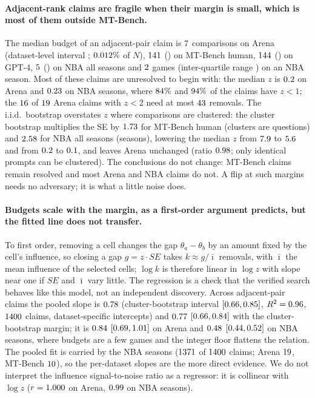 \documentclass{article}
\begin{document}
\paragraph{Adjacent-rank claims are fragile when their margin is small, which is most of them outside MT-Bench.} The median budget of an adjacent-pair claim is $7$ comparisons on Arena (dataset-level interval \biArenaCtwoRange; $0.012\%$ of $N$), $141$ (\biMTHCtwoRange) on MT-Bench human, $144$ (\biMTGCtwoRange) on GPT-4, $5$ (\biNBACtwoRange) on NBA all seasons and $2$ games (inter-quartile range \NBAsCtwoQ) on an NBA season. Most of these claims are unresolved to begin with: the median $z$ is $0.2$ on Arena and $0.23$ on NBA seasons, where $84\%$ and $94\%$ of the claims have $z<1$; the $16$ of $19$ Arena claims with $z<2$ need at most $43$ removals. The i.i.d.\ bootstrap overstates $z$ where comparisons are clustered: the cluster bootstrap multiplies the SE by $1.73$ for MT-Bench human (clusters are questions) and $2.58$ for NBA all seasons (seasons), lowering the median $z$ from $7.9$ to $5.6$ and from $0.2$ to $0.1$, and leaves Arena unchanged (ratio $0.98$; only identical prompts can be clustered). The conclusions do not change: MT-Bench claims remain resolved and most Arena and NBA claims do not. A flip at such margins needs no adversary; it is what a little noise does.

\paragraph{Budgets scale with the margin, as a first-order argument predicts, but the fitted line does not transfer.} To first order, removing a cell changes the gap $\theta_a-\theta_b$ by an amount fixed by the cell's influence, so closing a gap $g=z\cdot SE$ takes $k\approx g/\bar\imath$ removals, with $\bar\imath$ the mean influence of the selected cells; $\log k$ is therefore linear in $\log z$ with slope near one if $SE$ and $\bar\imath$ vary little. The regression is a check that the verified search behaves like this model, not an independent discovery. Across adjacent-pair claims the pooled slope is $0.78$ (cluster-bootstrap interval $[0.66, 0.85]$, $R^2=0.96$, $1400$ claims, dataset-specific intercepts) and $0.77$ $[0.66, 0.84]$ with the cluster-bootstrap margin; it is $0.84$ $[0.69, 1.01]$ on Arena and $0.48$ $[0.44, 0.52]$ on NBA seasons, where budgets are a few games and the integer floor flattens the relation. The pooled fit is carried by the NBA seasons ($1371$ of $1400$ claims; Arena $19$, MT-Bench $10$), so the per-dataset slopes are the more direct evidence. We do not interpret the influence signal-to-noise ratio as a regressor: it is collinear with $\log z$ ($r=1.000$ on Arena, $0.99$ on NBA seasons).
\end{document}
